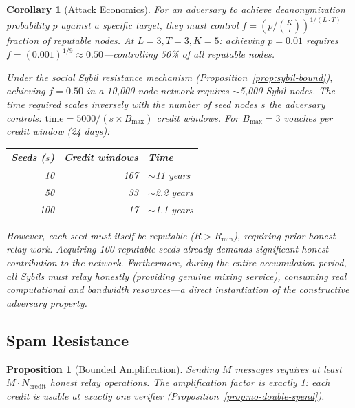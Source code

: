 \documentclass[11pt,a4paper]{article}
\newtheorem{corollary}[theorem]{Corollary}
\newtheorem{proposition}[theorem]{Proposition}
\begin{document}
\begin{corollary}[Attack Economics]
\label{cor:attack-econ}
For an adversary to achieve deanonymization probability $p$ against a specific target, they must control $f = (p/\binom{K}{T})^{1/(L \cdot T)}$ fraction of reputable nodes. At $L=3, T=3, K=5$: achieving $p = 0.01$ requires $f = (0.001)^{1/9} \approx 0.50$---controlling 50\% of all reputable nodes.

Under the social Sybil resistance mechanism (Proposition~\ref{prop:sybil-bound}), achieving $f = 0.50$ in a 10,000-node network requires $\sim$5,000 Sybil nodes. The time required scales inversely with the number of seed nodes $s$ the adversary controls: $\text{time} = 5000/(s \times B_{\max})$ credit windows. For $B_{\max} = 3$ vouches per credit window (24 days):

\begin{center}
\begin{tabular}{@{}rrl@{}}
\toprule
Seeds ($s$) & Credit windows & Time \\
\midrule
10 & 167 & $\sim$11 years \\
50 & 33 & $\sim$2.2 years \\
100 & 17 & $\sim$1.1 years \\
\bottomrule
\end{tabular}
\end{center}

However, each seed must itself be reputable ($R > R_{\min}$), requiring prior honest relay work. Acquiring 100 reputable seeds already demands significant honest contribution to the network. Furthermore, during the entire accumulation period, all Sybils must relay honestly (providing genuine mixing service), consuming real computational and bandwidth resources---a direct instantiation of the constructive adversary property.
\end{corollary}

\subsection{Spam Resistance}

\begin{proposition}[Bounded Amplification]
\label{prop:spam}
Sending $M$ messages requires at least $M \cdot N_{\text{credit}}$ honest relay operations. The amplification factor is exactly 1: each credit is usable at exactly one verifier (Proposition~\ref{prop:no-double-spend}).
\end{proposition}
\end{document}
